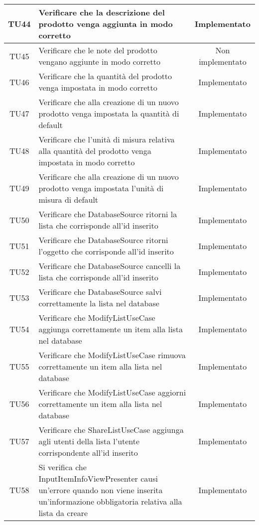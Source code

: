 \begin{center}
\begin{longtable}{|c|>{\centering}m{10cm}|c|}
		TU44 & Verificare che la descrizione del prodotto venga aggiunta in modo corretto & Implementato \\ \hline
		TU45 & Verificare che le note del prodotto vengano aggiunte in modo corretto & Non implementato \\ \hline
		TU46 & Verificare che la quantità del prodotto venga impostata in modo corretto & Implementato \\ \hline
		TU47 & Verificare che alla creazione di un nuovo prodotto venga impostata la quantità di default & Implementato \\ \hline
		TU48 & Verificare che l'unità di misura relativa alla quantità del prodotto venga impostata in modo corretto & Implementato \\ \hline
		TU49 & Verificare che alla creazione di un nuovo prodotto venga impostata l'unità di misura di default & Implementato \\ \hline
		TU50 & Verificare che DatabaseSource ritorni la lista che corrisponde all'id inserito & Implementato \\ \hline
		TU51 & Verificare che DatabaseSource ritorni l'oggetto che corrisponde all'id inserito & Implementato \\ \hline
		TU52 & Verificare che DatabaseSource cancelli la lista che corrisponde all'id inserito & Implementato \\ \hline
		TU53 & Verificare che DatabaseSource salvi correttamente la lista nel database & Implementato \\ \hline
		TU54 & Verificare che ModifyListUseCase aggiunga correttamente un item alla lista nel database & Implementato \\ \hline
		TU55 & Verificare che ModifyListUseCase rimuova correttamente un item alla lista nel database & Implementato \\ \hline
		TU56 & Verificare che ModifyListUseCase aggiorni correttamente un item alla lista nel database & Implementato \\ \hline
		TU57 & Verificare che ShareListUseCase aggiunga agli utenti della lista l’utente corrispondente all’id inserito & Implementato \\ \hline
		TU58 & Si verifica che InputItemInfoViewPresenter causi un'errore quando non viene inserita un'informazione obbligatoria relativa alla lista da creare & Implementato \\ \hline
	\end{longtable}
\end{center}
